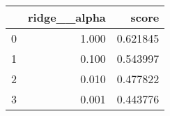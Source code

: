 \begin{tabular}{lrr}
\toprule
{} &  ridge\_\_alpha &     score \\
\midrule
0 &         1.000 &  0.621845 \\
1 &         0.100 &  0.543997 \\
2 &         0.010 &  0.477822 \\
3 &         0.001 &  0.443776 \\
\bottomrule
\end{tabular}
